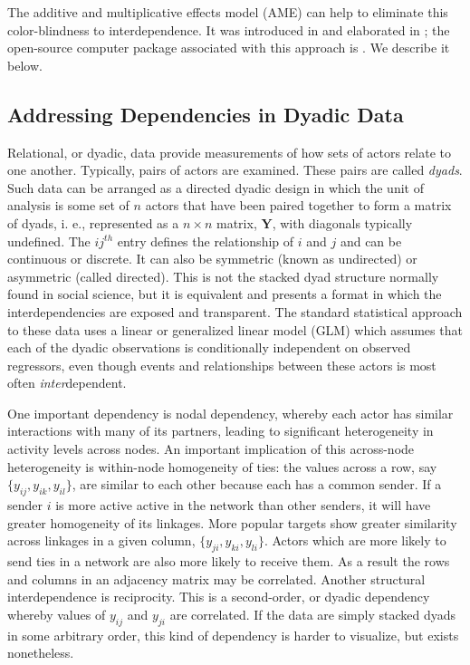 \documentclass[12pt]{amsart}
\begin{document}
The additive and multiplicative effects model (AME) can help to eliminate this color-blindness to interdependence. It was introduced in \cite{hoff:2008} and elaborated in \cite{hoff:2015}; the open-source computer package associated with this approach is \cite{amenpkg}. We describe it below.

\subsection*{\textbf{Addressing Dependencies in Dyadic Data}}

Relational, or dyadic, data provide measurements of how sets of actors relate to one another. Typically, pairs of actors are examined. These pairs are called \textit{dyads}. Such data can be arranged as a directed dyadic design in which the unit of analysis is some set of $n$ actors that have been paired together to form a matrix of dyads, i. e., represented as a $n \times n$ matrix, $\mathbf{Y}$, with diagonals typically undefined. The $ij^{th}$ entry defines the relationship of $i$ and $j$ and can be continuous or discrete. It can also be symmetric (known as undirected) or asymmetric (called directed). This is not the stacked dyad structure normally found in social science, but it is equivalent and presents a format in which the interdependencies are exposed and transparent. The standard statistical approach to these data uses a linear or generalized linear model (GLM) which assumes that each of the dyadic observations is conditionally independent on observed regressors, even though events and relationships between these actors is most often \textit{inter}dependent. 

One important dependency is nodal dependency, whereby each actor has similar interactions with many of its partners, leading to significant heterogeneity in activity levels across nodes. An important implication of this across-node heterogeneity is within-node homogeneity of ties: the values across a row, say $\{y_{ij},y_{ik},y_{il}\}$, are similar to each other because each has a common sender. If a sender $i$ is more active active in the network than other senders, it will have greater homogeneity of its linkages. More popular targets show greater similarity across linkages in a given column, $\{y_{ji},y_{ki},y_{li}\}$. Actors which are more likely to send ties in a network are also more likely to receive them. As a result the rows and columns in an adjacency matrix may be correlated. Another structural interdependence is reciprocity. This is a second-order, or dyadic dependency whereby values of $y_{ij}$ and $y_{ji}$ are correlated. If the data are simply stacked dyads in some arbitrary order, this kind of dependency is harder to visualize, but exists nonetheless.
\end{document}

